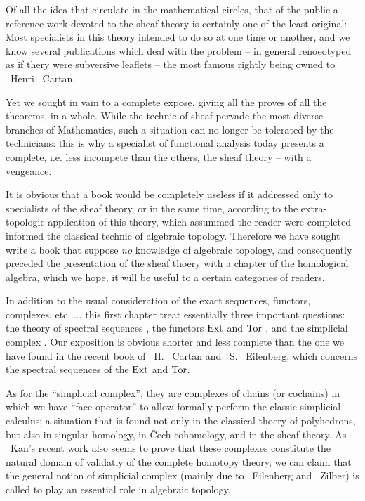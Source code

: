 \oldpage[I]
Of all the idea that circulate in the mathematical circles, 
that of the public a reference work devoted to the sheaf theory is certainly one of the least original: 
Most specialists in this theory intended to do so at one time or another, 
and we know several publications which deal with the problem
-- in general renoeotyped as if thery were subversive leaflets -- 
the most famous rightly being owned to ~Henri ~Cartan.

Yet we sought in vain to a complete expose, giving all the proves of all the theorems, in a whole.
While the technic of sheaf pervade the most diverse branches of Mathematics, 
such a situation can no longer be tolerated by the technicians: 
this is why a specialist of functional analysis today presents a complete, 
i.e. less incompete than the others, the sheaf theory -- with a vengeance.

It is obvious that a book would be completely useless if it addressed only to specialists of the sheaf theory, or in the same time, 
according to the extra-topologic application of this theory, which assummed the reader were completed informed the classical technic of algebraic topology. 
Therefore we have sought write a book that suppose \emph{no} knowledge of algebraic topology, 
and consequently preceded the presentation of the sheaf thoery with a chapter of the homological algebra, 
which we hope, it will be useful to a certain categories of readers.

In addition to the usual consideration of the exact sequences, functors, complexes, etc ..., 
this first chapter treat essentially three important questions: 
the theory of spectral sequences , 
the functors $\operatorname{Ext}$ and $\operatorname{Tor}$ , 
and the simplicial complex .
Our exposition is obvious shorter and less complete than the one we have found in the recent book of 
~H. ~Cartan and ~S. ~Eilenberg, which concerns the spectral sequences of the $\operatorname{Ext}$ and $\operatorname{Tor}$. 

\oldpage[II]
As for the ``simplicial complex'', they are complexes of chains (or cochains) in which we have ``face operator'' to allow formally perform the classic simplicial calculus; 
a situation that is found not only in the classical thoery of polyhedrons, but also in singular homology, in \v{C}ech cohomology, and in the sheaf theory. 
As ~Kan's recent work also seems to prove that these complexes constitute the natural domain of validatiy of the complete homotopy theory, 
we can claim that the general notion of simplicial complex (mainly due to ~Eilenberg and ~Zilber) is called to play an essential role in algebraic topology.

